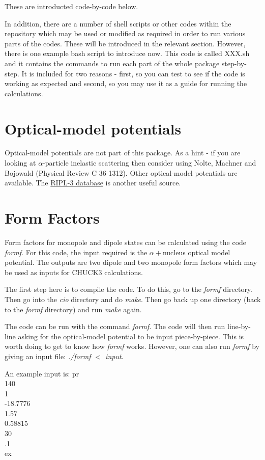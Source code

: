 \documentclass[a4paper,10pt]{article}
\begin{document}
These are introducted code-by-code below.

In addition, there are a number of shell scripts or other codes within the repository which may be used or modified as required in order to run various parts of the codes. These will be introduced in the relevant section. However, there is one example bash script to introduce now. This code is called XXX.sh and it contains the commands to run each part of the whole package step-by-step. It is included for two reasons - first, so you can test to see if the code is working as expected and second, so you may use it as a guide for running the calculations.

\section{Optical-model potentials}

Optical-model potentials are not part of this package. As a hint - if you are looking at $\alpha$-particle inelastic scattering then consider using Nolte, Machner and Bojowald (Physical Review C 36 1312). Other optical-model potentials are available. The \href{https://www-nds.iaea.org/RIPL-3/}{RIPL-3 database} is another useful source.

\section{Form Factors}

Form factors for monopole and dipole states can be calculated using the code {\it formf}. For this code, the input required is the $\alpha+$nucleus optical model potential. The outputs are two dipole and two monopole form factors which may be used as inputs for CHUCK3 calculations.

The first step here is to compile the code. To do this, go to the {\it formf} directory. Then go into the {\it cio} directory and do {\it make}. Then go back up one directory (back to the {\it formf} directory) and run {\it make} again.

The code can be run with the command {\it formf}. The code will then run line-by-line asking for the optical-model potential to be input piece-by-piece. This is worth doing to get to know how {\it formf} works. However, one can also run {\it formf} by giving an input file: {\it ./formf $<$ input}.

An example input is:
\newline
\noindent pr\\
140\\
1\\
-18.7776\\
1.57\\
0.58815\\
30\\
.1\\
ex\\
\end{document}
